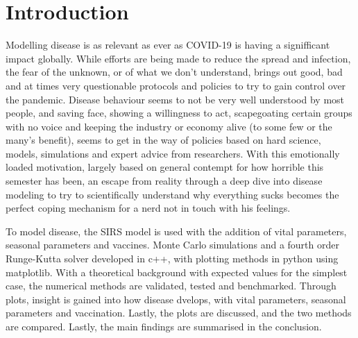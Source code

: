 \section{Introduction}
Modelling disease is as relevant as ever as COVID-19 is having a signifficant impact globally.
While efforts are being made to reduce the spread and infection, the fear of the unknown, or of what we don't understand, brings out good, bad and at times very questionable protocols and policies to try to gain control over the pandemic.
Disease behaviour seems to not be very well understood by most people, and saving face, showing a willingness to act, scapegoating certain groups with no voice and keeping the industry or economy alive (to some few or the many's benefit), seems to get in the way of policies based on hard science, models, simulations and expert advice from researchers.
With this emotionally loaded motivation, largely based on general contempt for how horrible this semester has been, an escape from reality through a deep dive into disease modeling to try to scientifically understand why everything sucks becomes the perfect coping mechanism for a nerd not in touch with his feelings. 

To model disease, the SIRS model is used with the addition of vital parameters, seasonal parameters and vaccines. 
Monte Carlo simulations and a fourth order Runge-Kutta solver developed in c++, with plotting methods in python using matplotlib. 
With a theoretical background with expected values for the simplest case, the numerical methods are validated, tested and benchmarked. 
Through plots, insight is gained into how disease dvelops, with vital parameters, seasonal parameters and vaccination.
Lastly, the plots are discussed, and the two methods are compared. Lastly, the main findings are summarised in the conclusion.